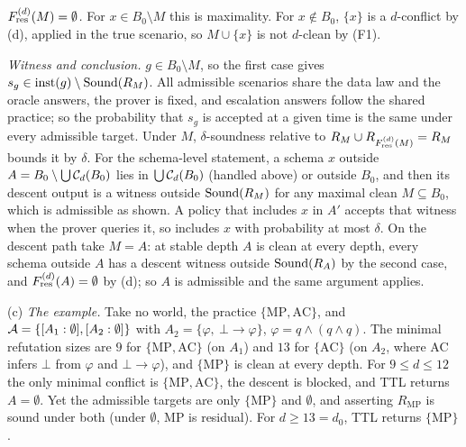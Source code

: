 \emph{$F^{(d)}_{\mathrm{res}}(M)=\emptyset$.} For $x\in B_0\setminus M$ this is maximality. For $x\notin B_0$, $\{x\}$ is a $d$-conflict by (d), applied in the true scenario, so $M\cup\{x\}$ is not $d$-clean by (F1).

\emph{Witness and conclusion.} $g\in B_0\setminus M$, so the first case gives $s_g\in\mathrm{inst}(g)\setminus\mathrm{Sound}(R_M)$. All admissible scenarios share the data law and the oracle answers, the prover is fixed, and escalation answers follow the shared practice; so the probability that $s_g$ is accepted at a given time is the same under every admissible target. Under $M$, $\delta$-soundness relative to $R_M\cup R_{F^{(d)}_{\mathrm{res}}(M)}=R_M$ bounds it by $\delta$. For the schema-level statement, a schema $x$ outside $A=B_0\setminus\bigcup\mathcal{C}_d(B_0)$ lies in $\bigcup\mathcal{C}_d(B_0)$ (handled above) or outside $B_0$, and then its descent output is a witness outside $\mathrm{Sound}(R_M)$ for any maximal clean $M\subseteq B_0$, which is admissible as shown. A policy that includes $x$ in $A'$ accepts that witness when the prover queries it, so includes $x$ with probability at most $\delta$. On the descent path take $M=A$: at stable depth $A$ is clean at every depth, every schema outside $A$ has a descent witness outside $\mathrm{Sound}(R_A)$ by the second case, and $F^{(d)}_{\mathrm{res}}(A)=\emptyset$ by (d); so $A$ is admissible and the same argument applies.

(c) \emph{The example.} Take no world, the practice $\{\mathrm{MP},\mathrm{AC}\}$, and $\mathcal{A}=\{[A_1 : \emptyset],[A_2 : \emptyset]\}$ with $A_2=\{\varphi,\ \bot\to\varphi\}$, $\varphi=q\wedge(q\wedge q)$. The minimal refutation sizes are $9$ for $\{\mathrm{MP},\mathrm{AC}\}$ (on $A_1$) and $13$ for $\{\mathrm{AC}\}$ (on $A_2$, where AC infers $\bot$ from $\varphi$ and $\bot\to\varphi$), and $\{\mathrm{MP}\}$ is clean at every depth. For $9\le d\le12$ the only minimal conflict is $\{\mathrm{MP},\mathrm{AC}\}$, the descent is blocked, and TTL returns $A=\emptyset$. Yet the admissible targets are only $\{\mathrm{MP}\}$ and $\emptyset$, and asserting $R_{\mathrm{MP}}$ is sound under both (under $\emptyset$, MP is residual). For $d\ge13=d_0$, TTL returns $\{\mathrm{MP}\}$.

